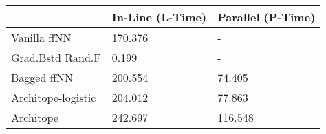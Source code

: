 \begin{tabular}{lll}
\toprule
{} & In-Line (L-Time) & Parallel (P-Time) \\
\midrule
Vanilla ffNN       &          170.376 &                 - \\
Grad.Bstd Rand.F   &            0.199 &                 - \\
Bagged ffNN        &          200.554 &            74.405 \\
Architope-logistic &          204.012 &            77.863 \\
Architope          &          242.697 &           116.548 \\
\bottomrule
\end{tabular}

